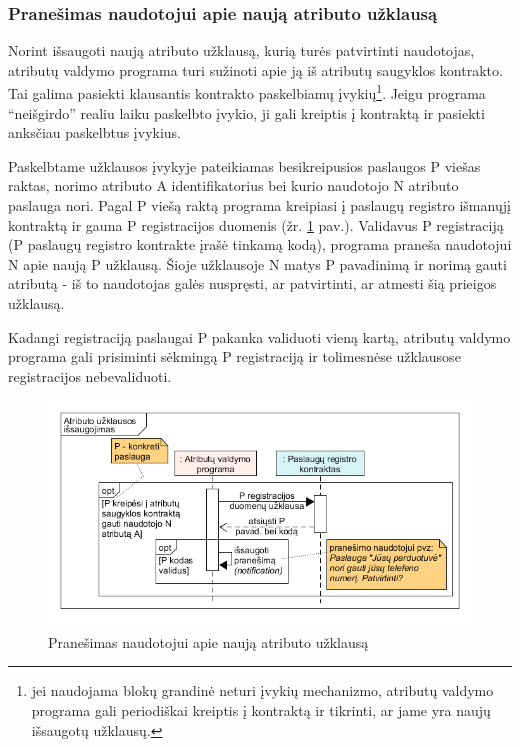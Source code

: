 \subsubsection{Pranešimas naudotojui apie naują atributo užklausą} \label{BCIDM:blockchainMonitoring}

Norint išsaugoti naują atributo užklausą, kurią turės patvirtinti naudotojas, atributų valdymo programa turi sužinoti
apie ją iš atributų saugyklos kontrakto. Tai galima pasiekti klausantis kontrakto paskelbiamų įvykių\footnote{ jei naudojama blokų grandinė
neturi įvykių mechanizmo, atributų valdymo programa gali periodiškai kreiptis į kontraktą ir tikrinti, ar jame yra naujų išsaugotų užklausų.}. Jeigu programa \enquote{neišgirdo}
realiu laiku paskelbto įvykio, ji gali kreiptis į kontraktą ir pasiekti anksčiau paskelbtus įvykius.

Paskelbtame užklausos įvykyje pateikiamas besikreipusios paslaugos P viešas raktas, norimo atributo A
identifikatorius bei kurio naudotojo N atributo paslauga nori. Pagal P viešą raktą programa kreipiasi
į paslaugų registro išmanųjį kontraktą ir gauna P registracijos duomenis (žr. \hypertarget{fig:checkForPendingPermissions}{\ref{fig:checkForPendingPermissions}} pav.).
Validavus P registraciją (P paslaugų registro
kontrakte įrašė tinkamą kodą), programa praneša naudotojui N apie naują P užklausą. Šioje užklausoje N
matys P pavadinimą ir norimą gauti atributą - iš to naudotojas galės nuspręsti, ar patvirtinti, ar atmesti šią prieigos užklausą.

Kadangi registraciją paslaugai P pakanka validuoti vieną kartą, atributų valdymo programa gali prisiminti sėkmingą P registraciją
ir tolimesnėse užklausose registracijos nebevaliduoti.

\begin{figure}[H]
    \centering
    \includegraphics[scale=0.6]{img/checkForPendingPermissions}
    \caption{Pranešimas naudotojui apie naują atributo užklausą}
    \label{fig:checkForPendingPermissions}
\end{figure}
